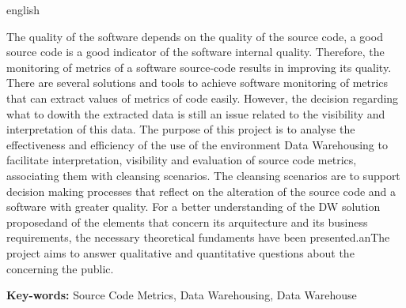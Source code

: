 \begin{resumo}[Abstract]
 \begin{otherlanguage*}{english}
 
The quality of the software depends on the quality of the source code, a good source code is a good indicator of the software internal quality. Therefore, the monitoring of metrics of a software source-code results in improving its quality. There are several solutions and tools to achieve software monitoring of metrics that can extract values of metrics of code easily. However, the decision regarding what to dowith the extracted data is still an issue related to the visibility and interpretation of this data. The purpose of this project is to analyse the effectiveness and efficiency of the use of the environment Data Warehousing to facilitate interpretation, visibility and evaluation of source code metrics, associating them with cleansing scenarios. The cleansing scenarios are to support decision making processes that reflect on the alteration of the source code and a software with greater quality. For a better understanding of the DW solution proposedand of the elements that concern its arquitecture and its business requirements, the necessary theoretical fundaments have been presented.anThe project aims to answer qualitative and quantitative questions about the concerning the public.
 
\textbf{Key-words:} Source Code Metrics,  Data Warehousing, Data Warehouse

 \end{otherlanguage*}
\end{resumo}